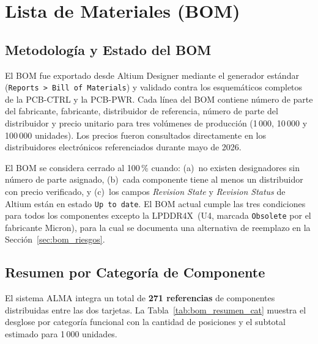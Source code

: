 \chapter{Lista de Materiales (BOM)}
\label{chap:bom}

\section{Metodología y Estado del BOM}
\label{sec:bom_metodologia}

El BOM fue exportado desde Altium Designer mediante el generador estándar
(\texttt{Reports > Bill of Materials}) y validado contra los esquemáticos
completos de la PCB-CTRL y la PCB-PWR. Cada línea del BOM contiene número de
parte del fabricante, fabricante, distribuidor de referencia, número de parte
del distribuidor y precio unitario para tres volúmenes de producción (1\,000,
10\,000 y 100\,000 unidades). Los precios fueron consultados directamente en los
distribuidores electrónicos referenciados durante mayo de 2026.

\begin{infobox}
  El BOM se considera cerrado al 100\,\% cuando: (a)~no existen designadores
  sin número de parte asignado, (b)~cada componente tiene al menos un
  distribuidor con precio verificado, y (c)~los campos \emph{Revision State}
  y \emph{Revision Status} de Altium están en estado \texttt{Up to date}.
  El BOM actual cumple las tres condiciones para todos los componentes excepto
  la LPDDR4X~(U4, marcada \texttt{Obsolete} por el fabricante Micron), para
  la cual se documenta una alternativa de reemplazo en la Sección~\ref{sec:bom_riesgos}.
\end{infobox}

\section{Resumen por Categoría de Componente}
\label{sec:bom_resumen}

El sistema ALMA integra un total de \textbf{271 referencias} de componentes
distribuidas entre las dos tarjetas. La Tabla~\ref{tab:bom_resumen_cat} muestra
el desglose por categoría funcional con la cantidad de posiciones y el subtotal
estimado para 1\,000 unidades.

